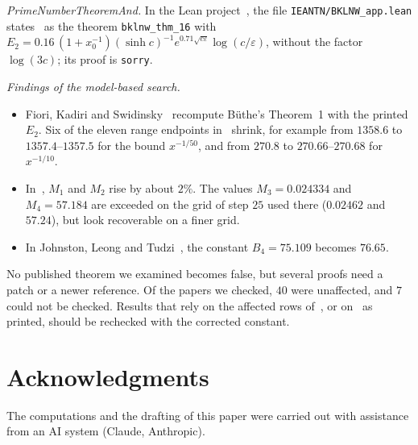 \documentclass{amsart}
\theoremstyle{definition}
\theoremstyle{remark}
\theoremstyle{plain}
\numberwithin{equation}{section}
\newcommand{\eps}{\varepsilon}
\begin{document}
\emph{PrimeNumberTheoremAnd.} In the Lean project~\cite{PNT}, the file \texttt{IEANTN/BKLNW\_app.lean} states~\cite[Thm.~1]{But16} as the theorem \texttt{bklnw\_thm\_16} with $E_2=0.16\,(1+x_0^{-1})(\sinh c)^{-1}e^{0.71\sqrt{c\eps}}\log(c/\eps)$, without the factor $\log(3c)$; its proof is \texttt{sorry}.

\emph{Findings of the model-based search.}
\begin{itemize}
\item Fiori, Kadiri and Swidinsky~\cite{FKS23b} recompute B\"uthe's Theorem~1 with the printed $E_2$. Six of the eleven range endpoints in~\cite[Table~7]{FKS23b} shrink, for example from $1358.6$ to $1357.4$--$1357.5$ for the bound $x^{-1/50}$, and from $270.8$ to $270.66$--$270.68$ for $x^{-1/10}$.
\item In~\cite[Table~15 and Cor.~11.1]{BKLNW21}, $M_1$ and $M_2$ rise by about $2\%$. The values $M_3=0.024334$ and $M_4=57.184$ are exceeded on the grid of step $25$ used there ($0.02462$ and $57.24$), but look recoverable on a finer grid.
\item In Johnston, Leong and Tudzi~\cite{JLT25}, the constant $B_4=75.109$ becomes $76.65$.
\end{itemize}
No published theorem we examined becomes false, but several proofs need a patch or a newer reference. Of the papers we checked, $40$ were unaffected, and $7$ could not be checked. Results that rely on the affected rows of~\cite[Table~8]{BKLNW21}, or on~\cite[Thm.~1]{But16} as printed, should be rechecked with the corrected constant.

\section*{Acknowledgments}
The computations and the drafting of this paper were carried out with assistance from an AI system (Claude, Anthropic).
\end{document}
